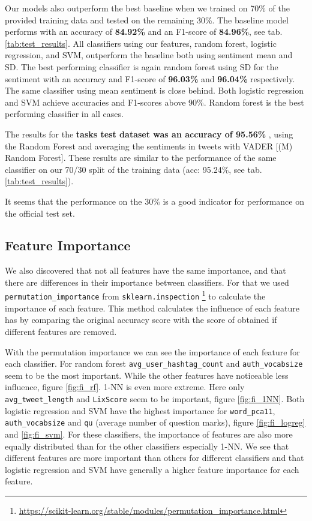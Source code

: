 Our models also outperform the best baseline when we trained on 70\% of the provided training data and tested on the remaining 30\%. The baseline model performs with an accuracy of \textbf{84.92\%} and an F1-score of \textbf{84.96\%}, see tab. \ref{tab:test_results}. All classifiers using our features, random forest, logistic regression, and SVM, outperform the baseline both using sentiment mean and SD. The best performing classifier is again random forest using SD for the sentiment with an accuracy and F1-score of \textbf{96.03\%} and \textbf{96.04\%} respectively. The same classifier using mean sentiment is close behind. Both logistic regression and SVM achieve accuracies and F1-scores above 90\%. Random forest is the best performing classifier in all cases. \par

The results for the \textbf{tasks test dataset was an accuracy of 95.56\% }, using the Random Forest and averaging the sentiments in tweets with VADER [(M) Random Forest]. These results are similar to the performance of the same classifier on our 70/30 split of the training data (acc: 95.24\%, see tab. \ref{tab:test_results}). 

It seems that the performance on the 30\% is a good indicator for performance on the official test set.

\subsection{Feature Importance}\label{sec:feature_imp}
We also discovered that not all features have the same importance, and that there are differences in their importance between classifiers. For that we used \verb'permutation_importance' from \verb'sklearn.inspection' \footnote{\url{https://scikit-learn.org/stable/modules/permutation\_importance.html}} to calculate the importance of each feature. This method calculates the influence of each feature has by comparing the original accuracy score with the score of obtained if different features are removed.  \par

With the permutation importance we can see the importance of each feature for each classifier. For random forest \verb'avg_user_hashtag_count' and \verb'auth_vocabsize' seem to be the most important. While the other features have noticeable less influence, figure \ref{fig:fi_rf}. 1-NN is even more extreme. Here only \verb'avg_tweet_length' and \verb'LixScore' seem to be important, figure \ref{fig:fi_1NN}. Both logistic regression and SVM have the highest importance for \verb'word_pca11', \verb'auth_vocabsize' and \verb'qu' (average number of question marks), figure \ref{fig:fi_logreg} and \ref{fig:fi_svm}. For these classifiers, the importance of features are also more equally distributed than for the other classifiers especially 1-NN. We see that different features are more important than others for different classifiers and that logistic regression and SVM have generally a higher feature importance for each feature.


